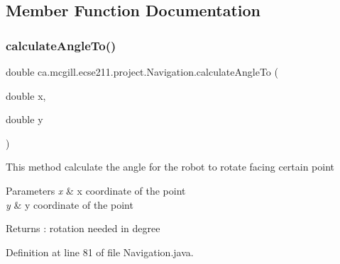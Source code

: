 \subsection{Member Function Documentation}
\mbox{\label{classca_1_1mcgill_1_1ecse211_1_1project_1_1_navigation_a4376e54162df8f123ca3b52e4fd2f38d}} 
\subsubsection{\texorpdfstring{calculate\+Angle\+To()}{calculateAngleTo()}}
{\footnotesize\ttfamily double ca.\+mcgill.\+ecse211.\+project.\+Navigation.\+calculate\+Angle\+To (\begin{DoxyParamCaption}\item[{double}]{x,  }\item[{double}]{y }\end{DoxyParamCaption})}

This method calculate the angle for the robot to rotate facing certain point


\begin{DoxyParams}{Parameters}
{\em x} & x coordinate of the point \\
\hline
{\em y} & y coordinate of the point \\
\hline
\end{DoxyParams}
\begin{DoxyReturn}{Returns}
\+: rotation needed in degree 
\end{DoxyReturn}


Definition at line 81 of file Navigation.\+java.



